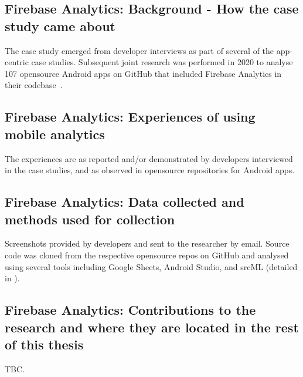 
\subsection{Firebase Analytics: Background - How the case study came about}
The case study emerged from developer interviews as part of several of the app-centric case studies. Subsequent joint research was performed in 2020 to analyse 107 opensource Android apps on GitHub that included Firebase Analytics in their codebase~.

\subsection{Firebase Analytics: Experiences of using mobile analytics}
The experiences are as reported and/or demonstrated by developers interviewed in the case studies, and as observed in opensource repositories for Android apps.

\subsection{Firebase Analytics: Data collected and methods used for collection}
Screenshots provided by developers and sent to the researcher by email. Source code was cloned from the respective opensource repos on GitHub and analysed using several tools including Google Sheets, Android Studio, and srcML (detailed in ).

\subsection{Firebase Analytics: Contributions to the research and where they are located in the rest of this thesis}
TBC.


\clearpage


